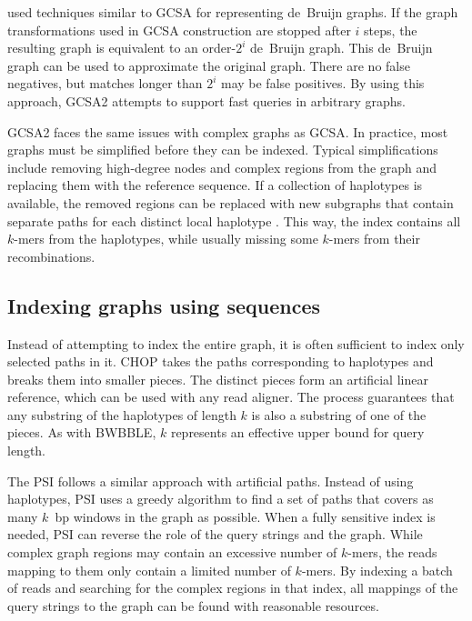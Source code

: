 \citeauthor{Bowe_2012} \cite{Bowe_2012} used techniques similar to GCSA for representing de~Bruijn graphs.
If the graph transformations used in GCSA construction are stopped after $i$ steps, the resulting graph is equivalent to an order-$2^{i}$ de~Bruijn graph.
This de~Bruijn graph can be used to approximate the original graph.
There are no false negatives, but matches longer than $2^{i}$ may be false positives.
By using this approach, GCSA2 \cite{Siren_2017} attempts to support fast queries in arbitrary graphs.

GCSA2 faces the same issues with complex graphs as GCSA.
In practice, most graphs must be simplified before they can be indexed.
Typical simplifications include removing high-degree nodes and complex regions from the graph and replacing them with the reference sequence.
If a collection of haplotypes is available, the removed regions can be replaced with new subgraphs that contain separate paths for each distinct local haplotype \cite{Siren_2019}.
This way, the index contains all $k$-mers from the haplotypes, while usually missing some $k$-mers from their recombinations.

\subsection{Indexing graphs using sequences}

Instead of attempting to index the entire graph, it is often sufficient to index only selected paths in it.
CHOP \cite{Mokveld_2018} takes the paths corresponding to haplotypes and breaks them into smaller pieces.
The distinct pieces form an artificial linear reference, which can be used with any read aligner.
The process guarantees that any substring of the haplotypes of length $k$ is also a substring of one of the pieces.
As with BWBBLE, $k$ represents an effective upper bound for query length.

The PSI \cite{Ghaffaari_2019} follows a similar approach with artificial paths.
Instead of using haplotypes, PSI uses a greedy algorithm to find a set of paths that covers as many $k$~bp windows in the graph as possible.
When a fully sensitive index is needed, PSI can reverse the role of the query strings and the graph.
While complex graph regions may contain an excessive number of $k$-mers, the reads mapping to them only contain a limited number of $k$-mers.
By indexing a batch of reads and searching for the complex regions in that index, all mappings of the query strings to the graph can be found with reasonable resources.


